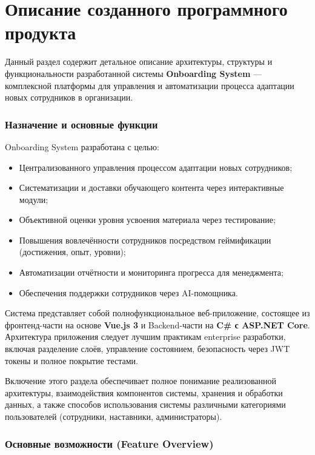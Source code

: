\section{Описание созданного программного продукта}

Данный раздел содержит детальное описание архитектуры, структуры и функциональности разработанной системы \textbf{Onboarding System} --- комплексной платформы для управления и автоматизации процесса адаптации новых сотрудников в организации.

\subsubsection*{Назначение и основные функции}

Onboarding System разработана с целью:
\begin{itemize}
    \item Централизованного управления процессом адаптации новых сотрудников;
    \item Систематизации и доставки обучающего контента через интерактивные модули;
    \item Объективной оценки уровня усвоения материала через тестирование;
    \item Повышения вовлечённости сотрудников посредством геймификации (достижения, опыт, уровни);
    \item Автоматизации отчётности и мониторинга прогресса для менеджмента;
    \item Обеспечения поддержки сотрудников через AI-помощника.
\end{itemize}

Система представляет собой полнофункциональное веб-приложение, состоящее из фронтенд-части на основе \textbf{Vue.js 3} и Backend-части на \textbf{C\# с ASP.NET Core}. Архитектура приложения следует лучшим практикам enterprise разработки, включая разделение слоёв, управление состоянием, безопасность через JWT токены и полное покрытие тестами.

Включение этого раздела обеспечивает полное понимание реализованной архитектуры, взаимодействия компонентов системы, хранения и обработки данных, а также способов использования системы различными категориями пользователей (сотрудники, наставники, администраторы).


\subsubsection*{Основные возможности (Feature Overview)}

